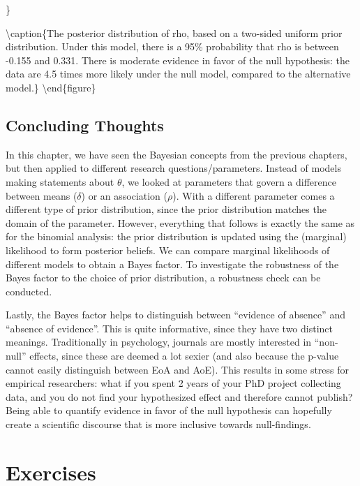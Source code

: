 \documentclass[
]{book}
\begin{document}
\}

\textbackslash caption\{The posterior distribution of rho, based on a two-sided uniform prior distribution. Under this model, there is a 95\% probability that rho is between -0.155 and 0.331. There is moderate evidence in favor of the null hypothesis: the data are 4.5 times more likely under the null model, compared to the alternative model.\}\label{fig:beer-tastiness-correlation-posterior}
\textbackslash end\{figure\}

\hypertarget{concluding-thoughts-3}{%
\section{Concluding Thoughts}\label{concluding-thoughts-3}}

In this chapter, we have seen the Bayesian concepts from the previous chapters, but then applied to different research questions/parameters. Instead of models making statements about \(\theta\), we looked at parameters that govern a difference between means (\(\delta\)) or an association (\(\rho\)). With a different parameter comes a different type of prior distribution, since the prior distribution matches the domain of the parameter. However, everything that follows is exactly the same as for the binomial analysis: the prior distribution is updated using the (marginal) likelihood to form posterior beliefs. We can compare marginal likelihoods of different models to obtain a Bayes factor. To investigate the robustness of the Bayes factor to the choice of prior distribution, a robustness check can be conducted.

Lastly, the Bayes factor helps to distinguish between ``evidence of absence'' and ``absence of evidence''. This is quite informative, since they have two distinct meanings. Traditionally in psychology, journals are mostly interested in ``non-null'' effects, since these are deemed a lot sexier (and also because the p-value cannot easily distinguish between EoA and AoE). This results in some stress for empirical researchers: what if you spent 2 years of your PhD project collecting data, and you do not find your hypothesized effect and therefore cannot publish? Being able to quantify evidence in favor of the null hypothesis can hopefully create a scientific discourse that is more inclusive towards null-findings.

\hypertarget{exercises}{%
\chapter{Exercises}\label{exercises}}
\end{document}
